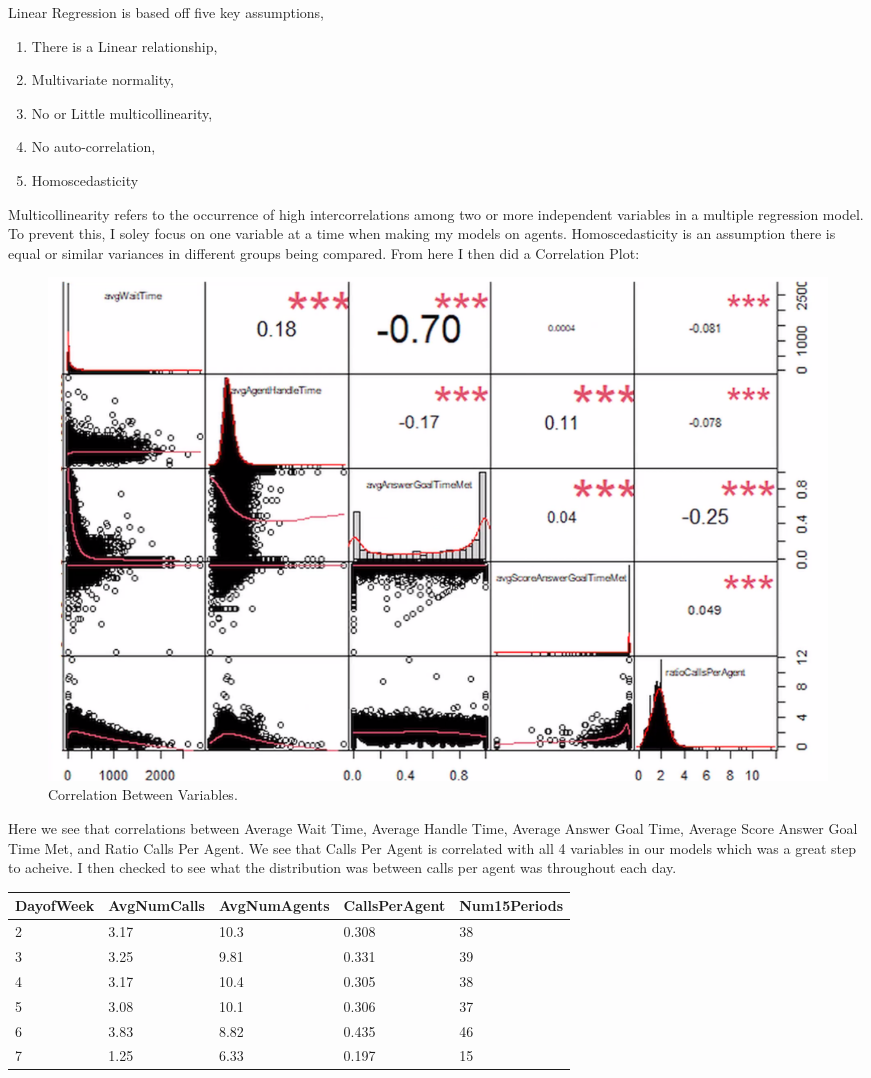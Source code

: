 \documentclass[12pt]{article}
\begin{document}
  Linear Regression is based off five key assumptions,
  \begin{enumerate}
  \item There is a Linear relationship,
  \item Multivariate normality,
  \item No or Little multicollinearity,
  \item No auto-correlation,
  \item Homoscedasticity
\end{enumerate} Multicollinearity refers to the occurrence of high intercorrelations among two or more independent variables in a multiple regression model.
To prevent this, I soley focus on one variable at a time when making my models on agents. Homoscedasticity is an assumption there is equal or similar variances in different groups being compared.
From here I then did a Correlation Plot:
\begin{figure}[H]
  \centering
  \includegraphics[width=\textwidth]{Correlation.png}
  \caption{Correlation Between Variables.}
  \label{fig:Correlation}
\end{figure}
Here we see that correlations between Average Wait Time, Average Handle Time, Average Answer Goal Time, Average Score Answer Goal Time Met, and Ratio Calls Per Agent.
We see that Calls Per Agent is correlated with all 4 variables in our models which was a great step to acheive. I then checked to see what the distribution was between calls per agent was throughout each day. 
  \begin{table}[H]
    \resizebox{\textwidth}{!} {
    \begin{tabular}{ l | l | l | l | l |}
      {\bf DayofWeek} & {\bf AvgNumCalls} & {\bf AvgNumAgents} & {\bf CallsPerAgent} & {\bf Num15Periods} \\
    \hline
    2 & 3.17 & 10.3 & 0.308 & 38 \\
    \hline
    3 & 3.25 & 9.81 & 0.331 & 39 \\
    \hline
    4 & 3.17 & 10.4 & 0.305 & 38 \\
    \hline
    5 & 3.08 & 10.1 & 0.306 & 37 \\
    \hline
    6 & 3.83 & 8.82 & 0.435 & 46 \\
    \hline
    7 & 1.25 & 6.33  & 0.197 & 15 \\
    \end{tabular}
    }
    \end{table}
\end{document}
